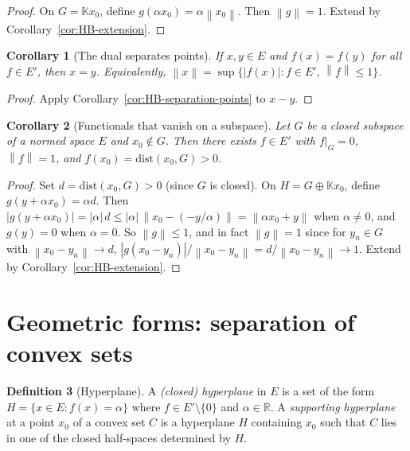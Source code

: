 \documentclass[a4paper,12pt]{book}
\newcommand{\R}{\mathbb{R}}
\newcommand{\K}{\mathbb{K}}
\newcommand{\norm}[1]{\left\| #1 \right\|}
\newcommand{\abs}[1]{\left| #1 \right|}
\theoremstyle{definition}
\newtheorem{definition}{Definition}[chapter]
\theoremstyle{plain}
\newtheorem{corollary}[definition]{Corollary}
\theoremstyle{remark}
\begin{document}
\begin{proof}
On $G=\K x_0$, define $g(\alpha x_0)=\alpha\norm{x_0}$. Then $\norm{g}=1$.
Extend by Corollary~\ref{cor:HB-extension}.
\end{proof}

\begin{corollary}[The dual separates points]\label{cor:dual-separates}
If $x,y\in E$ and $f(x)=f(y)$ for all $f\in E'$, then $x=y$.
Equivalently, $\norm{x}=\sup\{\abs{f(x)}:f\in E',\,\norm{f}\leq 1\}$.
\end{corollary}

\begin{proof}
Apply Corollary~\ref{cor:HB-separation-points} to $x-y$.
\end{proof}

\begin{corollary}[Functionals that vanish on a subspace]\label{cor:HB-annihilator}
Let $G$ be a closed subspace of a normed space $E$ and $x_0\notin G$. Then there
exists $f\in E'$ with $f|_G=0$, $\norm{f}=1$, and $f(x_0)=\mathrm{dist}(x_0,G)>0$.
\end{corollary}

\begin{proof}
Set $d=\mathrm{dist}(x_0,G)>0$ (since $G$ is closed). On $H=G\oplus\K x_0$,
define $g(y+\alpha x_0)=\alpha d$. Then $\abs{g(y+\alpha x_0)}=\abs{\alpha}\,d
\leq\abs{\alpha}\,\norm{x_0-(-y/\alpha)}=\norm{\alpha x_0+y}$ when $\alpha\neq 0$,
and $g(y)=0$ when $\alpha=0$. So $\norm{g}\leq 1$, and in fact $\norm{g}=1$
since for $y_n\in G$ with $\norm{x_0-y_n}\to d$,
$\abs{g(x_0-y_n)}/\norm{x_0-y_n}=d/\norm{x_0-y_n}\to 1$. Extend by
Corollary~\ref{cor:HB-extension}.
\end{proof}

\section{Geometric forms: separation of convex sets}

\begin{definition}[Hyperplane]\label{def:hyperplane}
A \emph{(closed) hyperplane} in $E$ is a set of the form
$H = \{x\in E : f(x) = \alpha\}$ where $f\in E'\setminus\{0\}$ and $\alpha\in\R$.
A \emph{supporting hyperplane} at a point $x_0$ of
a convex set $C$ is a hyperplane $H$ containing $x_0$ such that $C$ lies in one
of the closed half-spaces determined by $H$.
\end{definition}
\end{document}
